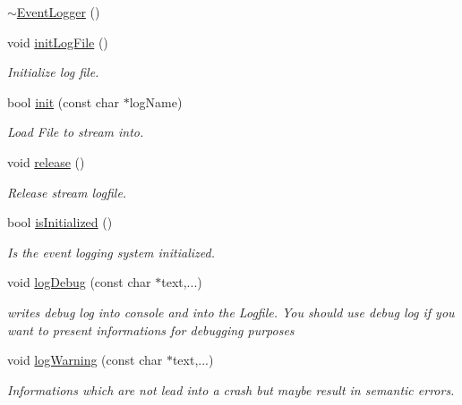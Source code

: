 \begin{DoxyCompactItemize}
\item 
\hyperlink{class_a_c_t_k_1_1_event_logger_ab196e054dc39ba8be643f20a09c90312}{$\sim$\-Event\-Logger} ()
\item 
void \hyperlink{class_a_c_t_k_1_1_event_logger_a74c318afde84d96d04a3e471109be44f}{init\-Log\-File} ()
\begin{DoxyCompactList}\small\item\em Initialize log file. \end{DoxyCompactList}\item 
bool \hyperlink{class_a_c_t_k_1_1_event_logger_a4561072a0270a26e4c36f7625f2c522c}{init} (const char $\ast$log\-Name)
\begin{DoxyCompactList}\small\item\em Load File to stream into. \end{DoxyCompactList}\item 
void \hyperlink{class_a_c_t_k_1_1_event_logger_ad62f786e5c37f393588baf7f2eac34a4}{release} ()
\begin{DoxyCompactList}\small\item\em Release stream logfile. \end{DoxyCompactList}\item 
bool \hyperlink{class_a_c_t_k_1_1_event_logger_a015baed5588155a09acc162287a9c554}{is\-Initialized} ()
\begin{DoxyCompactList}\small\item\em Is the event logging system initialized. \end{DoxyCompactList}\item 
void \hyperlink{class_a_c_t_k_1_1_event_logger_a5519a737d2f63b1a741e041edb579e19}{log\-Debug} (const char $\ast$text,...)
\begin{DoxyCompactList}\small\item\em writes debug log into console and into the Logfile. You should use debug log if you want to present informations for debugging purposes \end{DoxyCompactList}\item 
void \hyperlink{class_a_c_t_k_1_1_event_logger_a1e8e13e51f833526657233f1f84c0d65}{log\-Warning} (const char $\ast$text,...)
\begin{DoxyCompactList}\small\item\em Informations which are not lead into a crash but maybe result in semantic errors. \end{DoxyCompactList}\item 

\end{DoxyCompactItemize}
